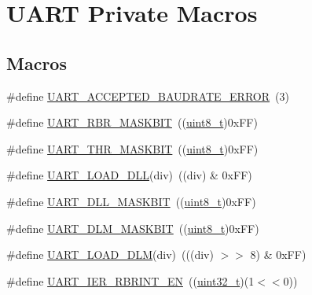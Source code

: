 \hypertarget{group___u_a_r_t___private___macros}{}\section{U\+A\+RT Private Macros}
\label{group___u_a_r_t___private___macros}
\subsection*{Macros}
\begin{DoxyCompactItemize}
\item 
\#define \hyperlink{group___u_a_r_t___private___macros_ga3b318954fbe283fa5da4dad6990b0b20}{U\+A\+R\+T\+\_\+\+A\+C\+C\+E\+P\+T\+E\+D\+\_\+\+B\+A\+U\+D\+R\+A\+T\+E\+\_\+\+E\+R\+R\+OR}~(3)
\item 
\#define \hyperlink{group___u_a_r_t___private___macros_ga06774e65c2ca095c4373122ed9a390b8}{U\+A\+R\+T\+\_\+\+R\+B\+R\+\_\+\+M\+A\+S\+K\+B\+IT}~((\hyperlink{_p_e___types_8h_aba7bc1797add20fe3efdf37ced1182c5}{uint8\+\_\+t})0x\+F\+F)
\item 
\#define \hyperlink{group___u_a_r_t___private___macros_ga1592b78e87967ae6a06756679cfc855e}{U\+A\+R\+T\+\_\+\+T\+H\+R\+\_\+\+M\+A\+S\+K\+B\+IT}~((\hyperlink{_p_e___types_8h_aba7bc1797add20fe3efdf37ced1182c5}{uint8\+\_\+t})0x\+F\+F)
\item 
\#define \hyperlink{group___u_a_r_t___private___macros_ga55a89461d99a43769772276e51a6710a}{U\+A\+R\+T\+\_\+\+L\+O\+A\+D\+\_\+\+D\+LL}(div)~((div) \& 0x\+F\+F)
\item 
\#define \hyperlink{group___u_a_r_t___private___macros_ga85050a24048ffc2de997cd60ea67f9df}{U\+A\+R\+T\+\_\+\+D\+L\+L\+\_\+\+M\+A\+S\+K\+B\+IT}~((\hyperlink{_p_e___types_8h_aba7bc1797add20fe3efdf37ced1182c5}{uint8\+\_\+t})0x\+F\+F)
\item 
\#define \hyperlink{group___u_a_r_t___private___macros_gaf4d480e07f82896893e45b572adeffcd}{U\+A\+R\+T\+\_\+\+D\+L\+M\+\_\+\+M\+A\+S\+K\+B\+IT}~((\hyperlink{_p_e___types_8h_aba7bc1797add20fe3efdf37ced1182c5}{uint8\+\_\+t})0x\+F\+F)
\item 
\#define \hyperlink{group___u_a_r_t___private___macros_gac53f4cc36f13edd3fdf7fd9bab1360e2}{U\+A\+R\+T\+\_\+\+L\+O\+A\+D\+\_\+\+D\+LM}(div)~(((div) $>$$>$ 8) \& 0x\+F\+F)
\item 
\#define \hyperlink{group___u_a_r_t___private___macros_gad6400102a6ec4fa634656b7ef18d1eba}{U\+A\+R\+T\+\_\+\+I\+E\+R\+\_\+\+R\+B\+R\+I\+N\+T\+\_\+\+EN}~((\hyperlink{_p_e___types_8h_a33594304e786b158f3fb30289278f5af}{uint32\+\_\+t})(1$<$$<$0))

\end{DoxyCompactItemize}

